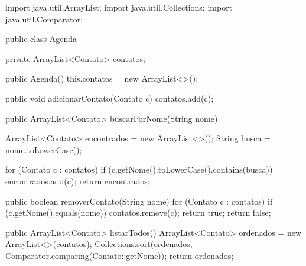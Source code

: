 \documentclass[11pt,a4paper]{article}
\begin{document}
\begin{javacode}
import java.util.ArrayList;
import java.util.Collections;
import java.util.Comparator;

public class Agenda {
    private ArrayList<Contato> contatos;

    public Agenda() {
        this.contatos = new ArrayList<>();
    }

    public void adicionarContato(Contato c) {
        contatos.add(c);
    }

    public ArrayList<Contato> buscarPorNome(String nome) {
        ArrayList<Contato> encontrados = new ArrayList<>();
        String busca = nome.toLowerCase();

        for (Contato c : contatos) {
            if (c.getNome().toLowerCase().contains(busca)) {
                encontrados.add(c);
            }
        }
        return encontrados;
    }

    public boolean removerContato(String nome) {
        for (Contato c : contatos) {
            if (c.getNome().equals(nome)) {
                contatos.remove(c);
                return true;
            }
        }
        return false;
    }

    public ArrayList<Contato> listarTodos() {
        ArrayList<Contato> ordenados = new ArrayList<>(contatos);
        Collections.sort(ordenados, Comparator.comparing(Contato::getNome));
        return ordenados;
    }
}
\end{javacode}
\end{document}
